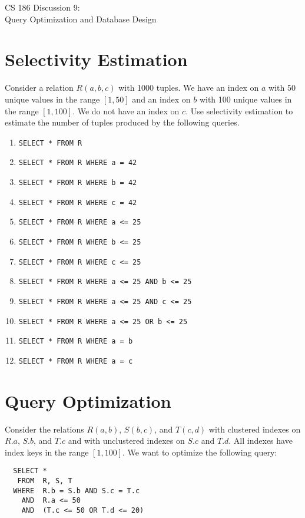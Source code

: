 \documentclass{article}
\newcommand{\sol}[1]{\iftoggle{showsolutions}{\textcolor{red}{#1}}{\phantom{#1}}}
\begin{document}
\begin{center}
  \huge
  CS 186 Discussion 9: \\
  Query Optimization and Database Design
\end{center}

\section{Selectivity Estimation}
Consider a relation $R(a, b, c)$ with 1000 tuples. We have an index on $a$ with
50 unique values in the range $[1, 50]$ and an index on $b$ with 100 unique
values in the range $[1, 100]$. We do not have an index on $c$. Use selectivity
estimation to estimate the number of tuples produced by the following queries.

\begin{enumerate}
  \item \texttt{SELECT * FROM R}
    \sol{1000}
  \item \texttt{SELECT * FROM R WHERE a = 42}
    \sol{$\frac{1}{50} \cdot 1000 = 20$}
  \item \texttt{SELECT * FROM R WHERE b = 42}
    \sol{$\frac{1}{100} \cdot 1000 = 10$}
  \item \texttt{SELECT * FROM R WHERE c = 42}
    \sol{$\frac{1}{10} \cdot 1000 = 100$}
  \item \texttt{SELECT * FROM R WHERE a <= 25}
    \sol{$\frac{1}{2} \cdot 1000 = 500$}
  \item \texttt{SELECT * FROM R WHERE b <= 25}
    \sol{$\frac{1}{4} \cdot 1000 = 250$}
  \item \texttt{SELECT * FROM R WHERE c <= 25}
    \sol{$\frac{1}{10} \cdot 1000 = 100$}
  \item \texttt{SELECT * FROM R WHERE a <= 25 AND b <= 25}
    \sol{$\frac{1}{2}\cdot\frac{1}{4}\cdot 1000 = 125$}
  \item \texttt{SELECT * FROM R WHERE a <= 25 AND c <= 25}
    \sol{$\frac{1}{2}\cdot\frac{1}{10}\cdot 1000 = 50$}
  \item \texttt{SELECT * FROM R WHERE a <= 25 OR b <= 25}
    \sol{$(\frac{1}{2} + \frac{1}{4} - \frac{1}{2}\cdot\frac{1}{4})\cdot 1000 = 625$}
  \item \texttt{SELECT * FROM R WHERE a = b}
    \sol{$\frac{1}{100} \cdot 1000 = 10$}
  \item \texttt{SELECT * FROM R WHERE a = c}
    \sol{$\frac{1}{50} \cdot 1000 = 20$}
\end{enumerate}

\section{Query Optimization}
Consider the relations $R(a, b)$, $S(b, c)$, and $T(c, d)$ with clustered
indexes on $R.a$, $S.b$, and $T.c$ and with unclustered indexes on $S.c$ and
$T.d$. All indexes have index keys in the range $[1, 100]$. We want to optimize
the following query:
\begin{verbatim}
  SELECT *
   FROM  R, S, T
  WHERE  R.b = S.b AND S.c = T.c
    AND  R.a <= 50
    AND  (T.c <= 50 OR T.d <= 20)
\end{verbatim}
\end{document}
